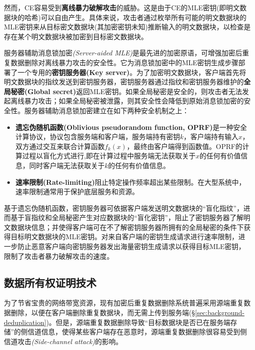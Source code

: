 然而，CE容易受到\textbf{离线暴力破解攻击}的威胁。这是由于CE的MLE密钥(即明文数据块的哈希)可以自由产生。具体来说，攻击者通过枚举所有可能的明文数据块的MLE密钥来从目标密文数据块(其加密密钥未知)推断输入的明文数据块，以检查是存在某个明文数据块被加密到目标密文数据块。

服务器辅助消息锁加密\textit{(Server-aided MLE)}\cite{bellare2013DupLESS}是最先进的加密原语，可增强加密后重复数据删除对离线暴力攻击的安全性。它为消息锁加密中的MLE密钥生成步骤部署了一个专用的\textbf{密钥服务器(Key server)}。为了加密明文数据块，客户端首先将明文数据块的指纹发送到密钥服务器，密钥服务器通过指纹和密钥服务器维护的\textbf{全局秘密(Global secret)}返回MLE密钥。如果全局秘密是安全的，则攻击者无法发起离线暴力攻击；如果全局秘密被泄露，则其安全性会降低到原始消息锁加密的安全性。服务器辅助消息锁加密建立在如下两种安全机制之上：

\begin{itemize}[leftmargin=0em]
    \item \textbf{遗忘伪随机函数(Oblivious pseudorandom function, OPRF)}\cite{naor2004Number}是一种安全计算协议，协议包含服务端和客户端，服务端持有密钥$k$，客户端持有输入$x$，双方通过交互来联合计算函数$f_k(x)$，最终由客户端得到函数值。OPRF的计算过程以盲化方式进行,即在计算过程中服务端无法获取关于$x$的任何有价值信息，同时客户端无法获取关于$k$的任何有价值信息。
    \item \textbf{速率限制(Rate-limiting)}\cite{bellare2013DupLESS}阻止特定操作频率超出某些限制。在大型系统中，速率限制通常用于保护底层服务和资源。
\end{itemize}

基于遗忘伪随机函数，密钥服务器可依据客户端发送明文数据块的“盲化指纹”，进而基于盲指纹和全局秘密产生对应数据块的“盲化密钥”，阻止了密钥服务器了解明文数据块信息；并使得客户端可在不了解密钥服务器所拥有的全局秘密的条件下获得目标明文数据块的MLE密钥。对来自客户端的密钥生成请求进行速率限制，进一步防止恶意客户端向密钥服务器发出海量密钥生成请求以获得目标MLE密钥，限制了攻击者暴力破解攻击的速度。

\subsection{数据所有权证明技术}
\label{subsec:background-encrypted-deduplication-pow}

为了节省宝贵的网络带宽资源，现有加密后重复数据删除系统普遍采用源端重复数据删除，以便在客户端删除重复数据块，而无需上传到服务端(\S\ref{sec:background-deduplication})。但是，源端重复数据删除导致“目标数据块是否已在服务端存储”的侧信道信息，使得某些客户端存在恶意时，源端重复数据删除很容易受到侧信道攻击\textit{(Side-channel attack)}\cite{harnik2010side,halevi11}的影响。

